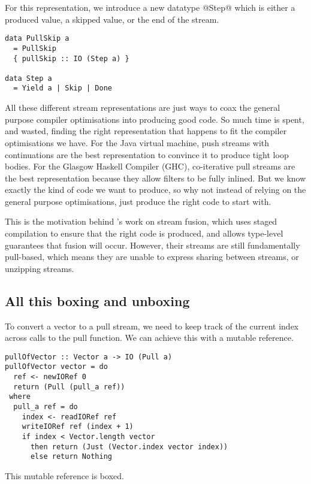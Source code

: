 For this representation, we introduce a new datatype @Step@ which is either a produced value, a skipped value, or the end of the stream.

\begin{lstlisting}
data PullSkip a
  = PullSkip
  { pullSkip :: IO (Step a) }

data Step a
  = Yield a | Skip | Done
\end{lstlisting}

All these different stream representations are just ways to coax the general purpose compiler optimisations into producing good code.
So much time is spent, and wasted, finding the right representation that happens to fit the compiler optimisations we have.
For the Java virtual machine, push streams with continuations are the best representation to convince it to produce tight loop bodies.
For the Glasgow Haskell Compiler (GHC), co-iterative pull streams are the best representation because they allow filters to be fully inlined.
But we know exactly the kind of code we want to produce, so why not instead of relying on the general purpose optimisations, just produce the right code to start with.

This is the motivation behind \citet{kiselyov2016stream}'s work on stream fusion, which uses staged compilation to ensure that the right code is produced, and allows type-level guarantees that fusion will occur.
However, their streams are still fundamentally pull-based, which means they are unable to express sharing between streams, or unzipping streams.

\subsection{All this boxing and unboxing}

To convert a vector to a pull stream, we need to keep track of the current index across calls to the pull function.
We can achieve this with a mutable reference.

\begin{lstlisting}
pullOfVector :: Vector a -> IO (Pull a)
pullOfVector vector = do
  ref <- newIORef 0
  return (Pull (pull_a ref))
 where
  pull_a ref = do
    index <- readIORef ref
    writeIORef ref (index + 1)
    if index < Vector.length vector
      then return (Just (Vector.index vector index))
      else return Nothing
\end{lstlisting}

This mutable reference is boxed. 



